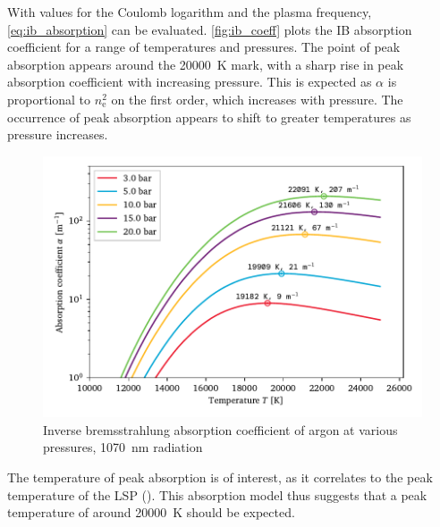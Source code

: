         With values for the Coulomb logarithm and the plasma frequency, \autoref{eq:ib_absorption} can be evaluated. \autoref{fig:ib_coeff} plots the IB absorption coefficient for a range of temperatures and pressures. The point of peak absorption appears around the \qty{20000}{K} mark, with a sharp rise in peak absorption coefficient with increasing pressure. This is expected as $\alpha$ is proportional to $n_\mathrm{e}^2$ on the first order, which increases with pressure. The occurrence of peak absorption appears to shift to greater temperatures as pressure increases.

        \begin{figure}[h]
            \centering
            \includegraphics[]{assets/4 models/absorption}
            \caption{Inverse bremsstrahlung absorption coefficient of argon at various pressures, \qty{1070}{nm} radiation}
            \label{fig:ib_coeff}
        \end{figure}

        The temperature of peak absorption is of interest, as it correlates to the peak temperature of the LSP (\textcite{keeferLaserSustainedPlasmas1989}). This absorption model thus suggests that a peak temperature of around \qty{20000}{K} should be expected.